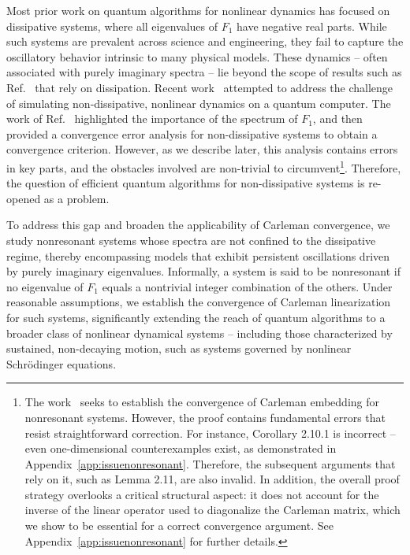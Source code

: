 \documentclass[superscriptaddress,onecolumn,nofootinbib,longbibliography,a4paper,accepted=2026-09-29]{quantumarticle}
\theoremstyle{plain}
\theoremstyle{definition}
\numberwithin{thm}{section}
\numberwithin{assumption}{section}
\numberwithin{lemma}{section}
\numberwithin{prop}{section}
\numberwithin{cor}{section}
\numberwithin{definition}{section}
\numberwithin{rmk}{section}
\numberwithin{equation}{section}
\begin{document}
Most prior work on quantum algorithms for nonlinear dynamics has focused on dissipative systems, where all eigenvalues of $F_1$ have negative real parts. While such systems are prevalent across science and engineering, they fail to capture the oscillatory behavior intrinsic to many physical models. These dynamics -- often associated with purely imaginary spectra -- lie beyond the scope of results such as Ref.~\cite{liu2021efficient} that rely on dissipation. Recent work~\cite{wu2024quantum} attempted to address the challenge of simulating non-dissipative, nonlinear dynamics on a quantum computer. The work of Ref.~\cite{wu2024quantum} highlighted the importance of the spectrum of $F_1$, and then provided a convergence error analysis for non-dissipative systems to obtain a convergence criterion. However, as we describe later, this analysis contains errors in key parts, and the obstacles involved are non-trivial to circumvent\footnote{The work~\cite{wu2024quantum} seeks to establish the convergence of Carleman embedding for nonresonant systems. However, the proof contains fundamental errors that resist straightforward correction. 
For instance, Corollary 2.10.1 is incorrect -- even one-dimensional counterexamples exist, as demonstrated in Appendix~\ref{app:issuenonresonant}. Therefore, the subsequent arguments that rely on it, such as Lemma 2.11, are also invalid. In addition, the overall proof strategy overlooks a critical structural aspect: it does not account for the inverse of the linear operator used to diagonalize the Carleman matrix, which we show to be essential for a correct convergence argument. See Appendix~\ref{app:issuenonresonant} for further details.}. Therefore, the question of efficient quantum algorithms for non-dissipative systems is re-opened as a problem. 

To address this gap and broaden the applicability of Carleman convergence, we study nonresonant systems whose spectra are not confined to the dissipative regime, thereby encompassing models that exhibit persistent oscillations driven by purely imaginary eigenvalues. Informally, a system is said to be nonresonant if no eigenvalue of $F_1$ equals a nontrivial integer combination of the others. Under reasonable assumptions, we establish the convergence of Carleman linearization for such systems, significantly extending the reach of quantum algorithms to a broader class of nonlinear dynamical systems -- including those characterized by sustained, non-decaying motion, such as systems governed by nonlinear Schr\"{o}dinger equations.
\end{document}
